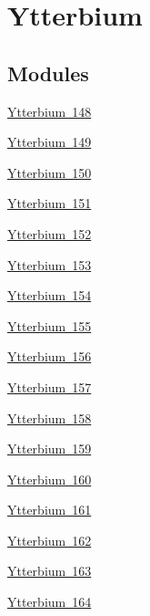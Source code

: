 \hypertarget{group___isotope_const-_ytterbium}{}\section{Ytterbium}
\label{group___isotope_const-_ytterbium}
\subsection*{Modules}
\begin{DoxyCompactItemize}
\item 
\mbox{\hyperlink{group___isotope_const-_ytterbium-_yb148}{Ytterbium 148}}
\item 
\mbox{\hyperlink{group___isotope_const-_ytterbium-_yb149}{Ytterbium 149}}
\item 
\mbox{\hyperlink{group___isotope_const-_ytterbium-_yb150}{Ytterbium 150}}
\item 
\mbox{\hyperlink{group___isotope_const-_ytterbium-_yb151}{Ytterbium 151}}
\item 
\mbox{\hyperlink{group___isotope_const-_ytterbium-_yb152}{Ytterbium 152}}
\item 
\mbox{\hyperlink{group___isotope_const-_ytterbium-_yb153}{Ytterbium 153}}
\item 
\mbox{\hyperlink{group___isotope_const-_ytterbium-_yb154}{Ytterbium 154}}
\item 
\mbox{\hyperlink{group___isotope_const-_ytterbium-_yb155}{Ytterbium 155}}
\item 
\mbox{\hyperlink{group___isotope_const-_ytterbium-_yb156}{Ytterbium 156}}
\item 
\mbox{\hyperlink{group___isotope_const-_ytterbium-_yb157}{Ytterbium 157}}
\item 
\mbox{\hyperlink{group___isotope_const-_ytterbium-_yb158}{Ytterbium 158}}
\item 
\mbox{\hyperlink{group___isotope_const-_ytterbium-_yb159}{Ytterbium 159}}
\item 
\mbox{\hyperlink{group___isotope_const-_ytterbium-_yb160}{Ytterbium 160}}
\item 
\mbox{\hyperlink{group___isotope_const-_ytterbium-_yb161}{Ytterbium 161}}
\item 
\mbox{\hyperlink{group___isotope_const-_ytterbium-_yb162}{Ytterbium 162}}
\item 
\mbox{\hyperlink{group___isotope_const-_ytterbium-_yb163}{Ytterbium 163}}
\item 
\mbox{\hyperlink{group___isotope_const-_ytterbium-_yb164}{Ytterbium 164}}

\end{DoxyCompactItemize}
